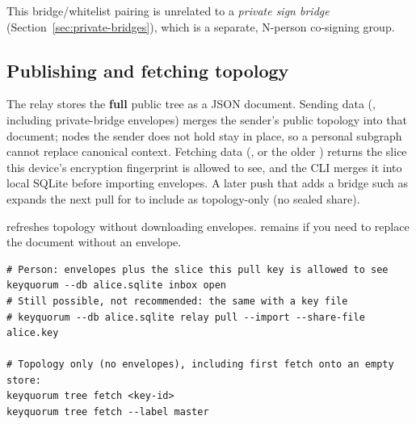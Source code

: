 \begin{noteBox}
This bridge/whitelist pairing is unrelated to a \emph{private sign bridge}
(Section~\ref{sec:private-bridges}), which is a separate, N-person
co-signing group.
\end{noteBox}

\subsection{Publishing and fetching topology}

The relay stores the \textbf{full} public tree as a JSON document. Sending
data (, including private-bridge envelopes) merges the
sender's public topology into that document; nodes the sender does not hold
stay in place, so a personal subgraph cannot replace canonical context.
Fetching data (, or the older ) returns the slice this device's
encryption fingerprint is allowed to see, and the CLI merges it into local
SQLite before importing envelopes. A later push that adds a bridge such as
 expands the next pull for  to include
 as topology-only (no sealed share).

 refreshes topology without downloading envelopes.
 remains if you need to replace the document without an
envelope.

\begin{lstlisting}
# Person: envelopes plus the slice this pull key is allowed to see
keyquorum --db alice.sqlite inbox open
# Still possible, not recommended: the same with a key file
# keyquorum --db alice.sqlite relay pull --import --share-file alice.key

# Topology only (no envelopes), including first fetch onto an empty store:
keyquorum tree fetch <key-id>
keyquorum tree fetch --label master
\end{lstlisting}
